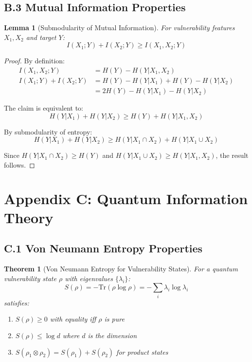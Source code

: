 \documentclass[journal]{IEEEtran}
\newtheorem{theorem}{Theorem}
\newtheorem{lemma}{Lemma}
\begin{document}
\subsection{B.3 Mutual Information Properties}

\begin{lemma}[Submodularity of Mutual Information]
For vulnerability features $X_1, X_2$ and target $Y$:
$$I(X_1; Y) + I(X_2; Y) \geq I(X_1, X_2; Y)$$
\end{lemma}

\begin{proof}
By definition:
\begin{align}
I(X_1, X_2; Y) &= H(Y) - H(Y|X_1, X_2) \\
I(X_1; Y) + I(X_2; Y) &= H(Y) - H(Y|X_1) + H(Y) - H(Y|X_2) \\
&= 2H(Y) - H(Y|X_1) - H(Y|X_2)
\end{align}

The claim is equivalent to:
$$H(Y|X_1) + H(Y|X_2) \geq H(Y) + H(Y|X_1, X_2)$$

By submodularity of entropy:
$$H(Y|X_1) + H(Y|X_2) \geq H(Y|X_1 \cap X_2) + H(Y|X_1 \cup X_2)$$

Since $H(Y|X_1 \cap X_2) \geq H(Y)$ and $H(Y|X_1 \cup X_2) \geq H(Y|X_1, X_2)$, the result follows.
\end{proof}

\section{Appendix C: Quantum Information Theory}

\subsection{C.1 Von Neumann Entropy Properties}

\begin{theorem}[Von Neumann Entropy for Vulnerability States]
For a quantum vulnerability state $\rho$ with eigenvalues $\{\lambda_i\}$:
$$S(\rho) = -\text{Tr}(\rho \log \rho) = -\sum_i \lambda_i \log \lambda_i$$
satisfies:
\begin{enumerate}
\item $S(\rho) \geq 0$ with equality iff $\rho$ is pure
\item $S(\rho) \leq \log d$ where $d$ is the dimension
\item $S(\rho_1 \otimes \rho_2) = S(\rho_1) + S(\rho_2)$ for product states
\end{enumerate}
\end{theorem}
\end{document}
